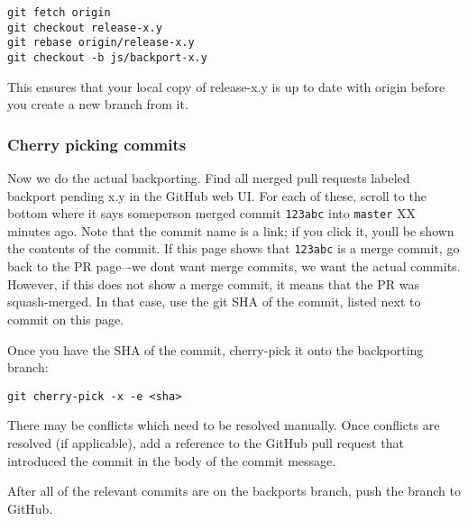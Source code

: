 \begin{lstlisting}
git fetch origin
git checkout release-x.y
git rebase origin/release-x.y
git checkout -b js/backport-x.y
\end{lstlisting}



This ensures that your local copy of release-x.y is up to date with origin before you create a new branch from it.



\hypertarget{6792962923353110702}{}


\subsubsection{Cherry picking commits}



Now we do the actual backporting. Find all merged pull requests labeled {\textquotedbl}backport pending x.y{\textquotedbl} in the GitHub web UI. For each of these, scroll to the bottom where it says {\textquotedbl}someperson merged commit \texttt{123abc} into \texttt{master} XX minutes ago{\textquotedbl}. Note that the commit name is a link; if you click it, you{\textquotesingle}ll be shown the contents of the commit. If this page shows that \texttt{123abc} is a merge commit, go back to the PR page–-we don{\textquotesingle}t want merge commits, we want the actual commits. However, if this does not show a merge commit, it means that the PR was squash-merged. In that case, use the git SHA of the commit, listed next to commit on this page.



Once you have the SHA of the commit, cherry-pick it onto the backporting branch:




\begin{lstlisting}
git cherry-pick -x -e <sha>
\end{lstlisting}



There may be conflicts which need to be resolved manually. Once conflicts are resolved (if applicable), add a reference to the GitHub pull request that introduced the commit in the body of the commit message.



After all of the relevant commits are on the backports branch, push the branch to GitHub.



\hypertarget{14599065304395472247}{}


